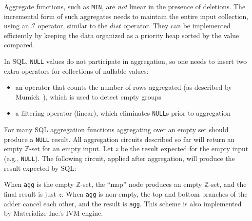 \documentclass[twocolumn
]{svjour3}
\numberwithin{equation}{section}
\newcommand{\zr}{$\Z$-set\xspace}
\newcommand{\code}[1]{\mbox{\texttt{#1}}}
\newcommand{\Z}{\mathbb{Z}}  %
\newcommand{\I}{\mathcal{I}}  %
\newcommand{\I}{\mathit{I}}  %
\newcommand{\distinct}{\mathit{dist}}  %
\begin{document}
Aggregate functions, such as \code{MIN}, are \emph{not} linear in the
presence of deletions.  The incremental form of such aggregates needs
to maintain the entire input collection, using an $\I$ operator,
similar to the $\distinct$ operator.  They can be implemented
efficiently by keeping the data organized as a priority heap sorted by
the value compared.

In SQL, \code{NULL} values do not participate in aggregation, so one
needs to insert two extra operators for collections of nullable
values:
\begin{itemize}
  \item an operator that counts the number of rows aggregated (as
    described by Mumick~\cite{mumick-sigmod97}), which is used to
    detect empty groups
  \item a filtering operator (linear), which eliminates \code{NULL}s
    prior to aggregation
\end{itemize}

For many SQL aggregation functions aggregating over an empty set
should produce a \code{NULL} result.  All aggregation circuits
described so far will return an empty \zr for an empty input.  Let $z$
be the result expected for the empty input (e.g., \code{NULL}).  The
following circuit, applied after aggregation, will produce the result
expected by SQL:

\begin{center}
\end{center}

\noindent When \code{agg} is the empty \zr, the ``map'' node produces
an empty \zr, and the final result is just $z$.  When \code{agg} is
non-empty, the top and bottom branches of the adder cancel each other,
and the result is \code{agg}.  This scheme is also implemented by
Materialize Inc.'s IVM engine.
\end{document}
